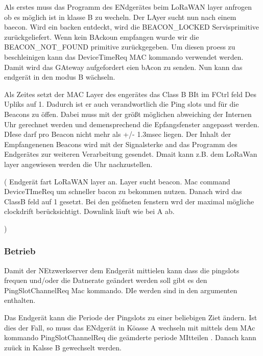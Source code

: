 \documentclass[a4paper,12pt]{article}
\begin{document}
                Als erstes muss das Programm des ENdgerätes beim LoRaWAN layer anfrogen ob es möglich ist in klasse B zu wecheln. Der LAyer sucht nun nach einem baecon. Wird ein backen entdeckt, wird die BEACON\_LOCKED Servisprimitive  zurückgeliefert. Wenn kein BAckoun empfangen wurde wir die BEACON\_NOT\_FOUND
                primitive zurückgegeben. Um diesen proess zu beschleinigen kann das DeviceTimeReq MAC kommando verwendet werden. Damit wird das GAteway aufgefordert eien bAcon zu senden. Nun kann das endgerät in den modus B wächseln.

                Als Zeites setzt der MAC Layer des engerätes das Class B BIt im FCtrl feld Des Upliks auf 1. Dadurch ist er auch verandwortlich die
                Ping slots und für die Beacons zu öffen. Dabei muss mit der größt möglichen abweiching der Internen Uhr gerechnet werden und demensprechend die Epfangsfenster angepasst werden. DIese darf pro Beacon nicht mehr als +/- 1.3msec liegen.
                Der Inhalt der Empfangenenen Beacons wird mit der Signalsterke and das Programm des Endgerätes zur weiteren Verarbeitung gesendet. 
                Dmait kann z.B. dem LoRaWan layer angewiesen werden die Uhr nachzustellen. 

                \cite{LoRaSpec}(
                    Endgerät fart LoRaWAN layer an. Layer sucht beacon. Mac command DeviceTImeReq um schneller bacon zu bekommen nutzen. Danach wird das ClassB feld auf 1 gesetzt. Bei den geöfneten fenstern wrd der maximal mögliche clockdrift berücksichtigt.
                    Downlink läuft wie bei A ab.


                )
            \subsubsection{Betrieb}
                
                Damit der NEtzwerkserver dem Endgerät mittielen kann dass die pingslots frequen und/oder die Datnerate geändert werden soll gibt es den PingSlotChannelReq Mac kommando. DIe werden sind in den argumenten enthalten.
                    
                Das Endgerät kann die Periode der Pingslots zu einer beliebigen Ziet ändern. Ist dies der Fall, so muss das ENdgerät in Köasse A wechseln mit mittels dem MAc kommando
                PingSlotChannelReq die geämderte periode MItteilen . Danach kann zuück in Kalsse B gewechselt werden.
\end{document}
